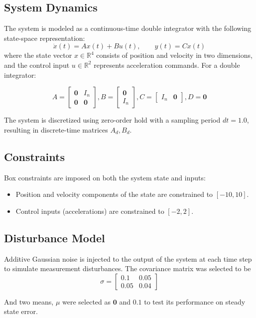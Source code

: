 \documentclass[11pt,a4paper]{article}
\begin{document}
\subsection{System Dynamics}
The system is modeled as a continuous-time double integrator with the following state-space representation:
\[
\dot{x}(t) = A x(t) + B u(t), \qquad y(t) = C x(t)
\]
where the state vector \(x \in \mathbb{R}^4\) consists of position and velocity in two dimensions, and the control input \(u \in \mathbb{R}^2\) represents acceleration commands.
For a double integrator:

$$A = \begin{bmatrix}
\mathbf{0} & I_n \\
\mathbf{0} & \mathbf{0}
\end{bmatrix},
B = \begin{bmatrix}
\mathbf{0} \\
I_n
\end{bmatrix},
C = \begin{bmatrix}
I_n & \mathbf{0}
\end{bmatrix},
D = \mathbf{0}$$


The system is discretized using zero-order hold with a sampling period \(dt = 1.0\), resulting in discrete-time matrices \(A_d, B_d\).

\subsection{Constraints}
Box constraints are imposed on both the system state and inputs:
\begin{itemize}
    \item Position and velocity components of the state are constrained to \([-10, 10]\).
    \item Control inputs (accelerations) are constrained to \([-2, 2]\).
\end{itemize}

\subsection{Disturbance Model}
Additive Gaussian noise is injected to the output of the system at each time step to simulate measurement disturbances. The covariance matrix was selected to be
$$\sigma = \begin{bmatrix}
    0.1  & 0.05 \\
    0.05 & 0.04
\end{bmatrix}$$

And two means, $\mu$ were selected as $\mathbf{0}$ and $\mathbf{0.1}$ to test its performance on steady state error. 
\end{document}
